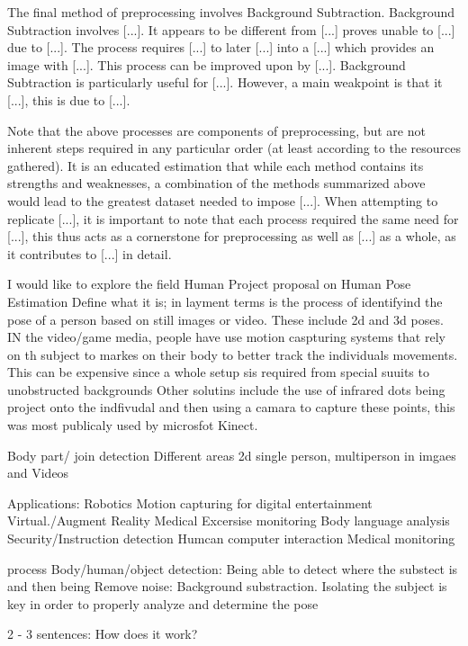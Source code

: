 \documentclass[12pt]{extarticle}
\begin{document}
The final method of preprocessing involves Background Subtraction. Background Subtraction involves [...]. It appears to be different from  [...] proves unable to [...] due to [...]. The process requires [...] to later [...] into a [...] which provides an image with [...]. This process can be improved upon by [...]. Background Subtraction is particularly useful for [...]. However, a main weakpoint is that it [...], this is due to [...].

Note that the above processes are components of preprocessing, but are not inherent steps required in any particular order (at least according to the resources gathered). It  is an educated estimation that while each method contains its strengths and weaknesses, a combination of the methods summarized above would lead to the greatest dataset needed to impose [...]. When attempting to replicate [...], it is important to note that each process required the same need for [...], this thus acts as a cornerstone for preprocessing as well as [...] as a whole, as it contributes to [...] in detail.

I would like to explore the field Human Project proposal on Human Pose Estimation
Define what it is; in layment terms is the process of identifyind the pose of a person based on still images or video. These include 2d and 3d poses.
IN the video/game media, people have use motion caspturing systems that rely on th subject to markes on their body to better track the individuals movements. This can be expensive since a whole setup sis required from special suuits to unobstructed backgrounds
Other solutins include the use of infrared dots being project onto the indfivudal and then using a camara to capture these points, this was most publicaly used by microsfot Kinect.


Body part/ join detection
Different areas
2d single person, multiperson in imgaes and Videos

Applications:
  Robotics
  Motion capturing for digital entertainment
  Virtual./Augment Reality
  Medical
  Excersise monitoring
  Body language analysis
  Security/Instruction detection
  Humcan computer interaction
  Medical monitoring

process
Body/human/object detection: Being able to detect where the substect is and then being
Remove noise: Background substraction. Isolating the subject is key in order to properly analyze and determine the pose


    2 - 3 sentences: How does it work?
\end{document}
